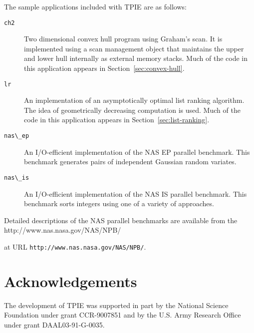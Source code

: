 The sample applications included with TPIE are as follows:

\begin{description}
\item[\verb|ch2|] Two dimensional convex hull
  program using Graham's scan.  It is implemented using a scan
  management object that maintains the upper and lower hull internally
  as external memory stacks.  Much of the code in this application
  appears in Section~\ref{sec:convex-hull}.
\item[\verb|lr|] An implementation of an asymptotically optimal list
  ranking  algorithm.  The idea of geometrically
  decreasing computation is used.  Much of the code in this
  application appears in Section~\ref{sec:list-ranking}.
\item[\verb|nas\_ep|] An I/O-efficient implementation of the NAS EP
  parallel benchmark.  This benchmark generates pairs of independent
  Gaussian random variates.
\item[\verb|nas\_is|] An I/O-efficient implementation of the NAS IS
  parallel benchmark.  This benchmark sorts integers using one of a
  variety of approaches.
\end{description}

Detailed descriptions of the NAS parallel benchmarks are available
from the %
{http://www.nas.nasa.gov/NAS/NPB/}
\begin{latexonly}
at URL \verb|http://www.nas.nasa.gov/NAS/NPB/|.
\end{latexonly}

\chapter*{Acknowledgements}

The development of TPIE was supported in part by the National Science
Foundation under grant CCR-9007851 and by the U.S. Army Research
Office under grant DAAL03-91-G-0035.

